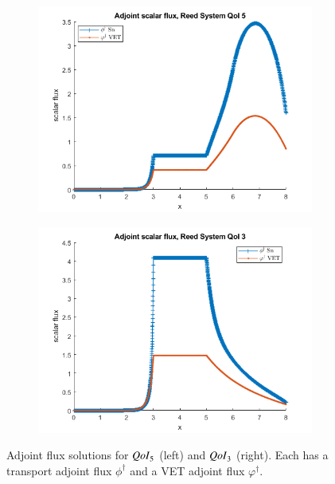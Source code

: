 \documentclass{anstrans}
\newcommand{\qoi}{{\it QoI}\xspace}
\begin{document}
\begin{figure}
\centering
\begin{subfigure}{.25\textwidth}
  \centering
  \includegraphics[width=.98\linewidth]{774phia.png}
\end{subfigure}%
\begin{subfigure}{.25\textwidth}
  \centering
  \includegraphics[width=.98\linewidth]{772phia.png}
\end{subfigure}
\caption{Adjoint flux solutions for $\qoi_5$ (left) and $\qoi_3$ (right). Each has a transport adjoint flux $\phi^\dag$ and a VET adjoint flux $\varphi^\dag$.}
\label{fig:adj}
\end{figure}
\end{document}
